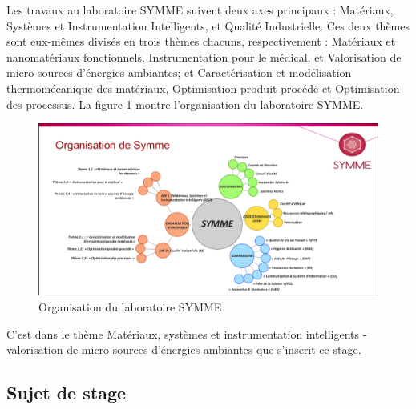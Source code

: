 \documentclass[a4paper, french, 12pt, titlepage]{article}
\begin{document}
Les travaux au laboratoire SYMME suivent deux axes principaux : \og{}Matériaux, Systèmes et Instrumentation Intelligents\fg{}, et \og{}Qualité Industrielle\fg{}.
Ces deux thèmes sont eux-mêmes divisés en trois thèmes chacuns, respectivement : \og{}Matériaux et nanomatériaux fonctionnels\fg{}, \og{}Instrumentation pour le médical\fg{}, et \og{}Valorisation de micro-sources d'énergies ambiantes\fg{}; et \og{}Caractérisation et modélisation thermomécanique des matériaux\fg{}, \og{}Optimisation produit-procédé\fg{} et \og{}Optimisation des processus\fg{}.
La figure \ref{fig:fig1} montre l'organisation du laboratoire SYMME.

\begin{figure}[H]
  \includegraphics[width=\linewidth]{organigramme.png}
  \caption{Organisation du laboratoire SYMME.}
  \label{fig:fig1}
\end{figure}

C'est dans le thème \og{}Matériaux, systèmes et instrumentation intelligents - valorisation de micro-sources d'énergies ambiantes\fg{} que s'inscrit ce stage.

\subsection{Sujet de stage}
\end{document}
